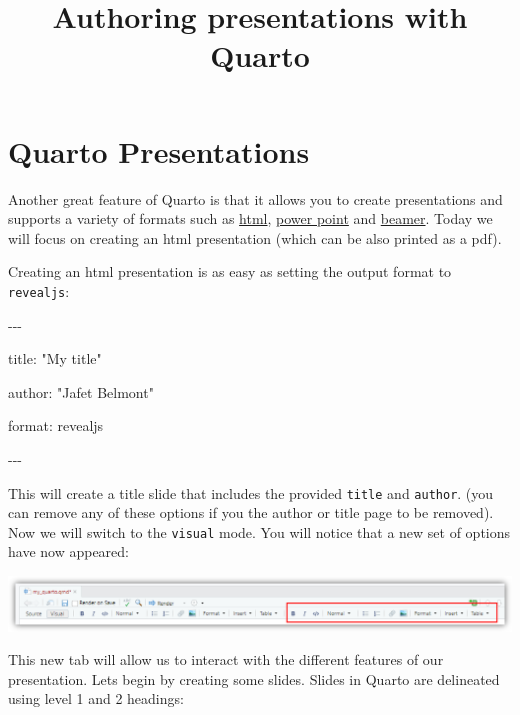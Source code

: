 \documentclass[
  letterpaper,
  DIV=11,
  numbers=noendperiod]{scrartcl}
\title{Authoring presentations with Quarto}
\author{}
\date{}
\makeatletter
\newenvironment{Shaded}{\begin{snugshade}}{\end{snugshade}}
\newcommand{\NormalTok}[1]{\textcolor[rgb]{0.00,0.23,0.31}{#1}}
\newcommand{\SpecialCharTok}[1]{\textcolor[rgb]{0.37,0.37,0.37}{#1}}
\newcommand{\StringTok}[1]{\textcolor[rgb]{0.13,0.47,0.30}{#1}}
\renewcommand{\maketitle}{\bgroup\setlength{\parindent}{0pt}
\begin{flushleft}
  {\color{uniblue}\sffamily\huge\textbf{\@title}} \vspace{0.3cm} \newline
  {\Large {\@subtitle}} \newline
  \@author
\end{flushleft}\egroup
}
\makeatother
\begin{document}
\maketitle

\pagestyle{mystyle}

\section{Quarto Presentations}\label{quarto-presentations}

Another great feature of Quarto is that it allows you to create
presentations and supports a variety of formats such as
\href{https://quarto.org/docs/presentations/revealjs/}{html},
\href{https://quarto.org/docs/presentations/powerpoint.html}{power
point} and
\href{https://quarto.org/docs/presentations/beamer.html}{beamer}. Today
we will focus on creating an html presentation (which can be also
printed as a pdf).

Creating an html presentation is as easy as setting the output format to
\texttt{revealjs}:

\begin{Shaded}
\begin{Highlighting}[]

\SpecialCharTok{{-}{-}{-}}

\NormalTok{title}\SpecialCharTok{:} \StringTok{"My title"}

\NormalTok{author}\SpecialCharTok{:} \StringTok{"Jafet Belmont"}

\NormalTok{format}\SpecialCharTok{:}\NormalTok{ revealjs}

\SpecialCharTok{{-}{-}{-}}
\end{Highlighting}
\end{Shaded}

This will create a title slide that includes the provided \texttt{title}
and \texttt{author}. (you can remove any of these options if you the
author or title page to be removed). Now we will switch to the
\texttt{visual} mode. You will notice that a new set of options have now
appeared:

\begin{center}
\includegraphics{images/quarto13.png}
\end{center}

This new tab will allow us to interact with the different features of
our presentation. Lets begin by creating some slides. Slides in Quarto
are delineated using level 1 and 2 headings:
\end{document}
